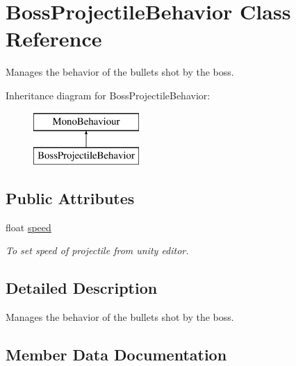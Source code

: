 \hypertarget{class_boss_projectile_behavior}{}\section{Boss\+Projectile\+Behavior Class Reference}
\label{class_boss_projectile_behavior}


Manages the behavior of the bullets shot by the boss.  


Inheritance diagram for Boss\+Projectile\+Behavior\+:\begin{figure}[H]
\begin{center}
\leavevmode
\includegraphics[height=2.000000cm]{class_boss_projectile_behavior}
\end{center}
\end{figure}
\subsection*{Public Attributes}
\begin{DoxyCompactItemize}
\item 
float \mbox{\hyperlink{class_boss_projectile_behavior_a87fd33ddd5893e4b57c9245240855d0e}{speed}}
\begin{DoxyCompactList}\small\item\em To set speed of projectile from unity editor. \end{DoxyCompactList}\end{DoxyCompactItemize}


\subsection{Detailed Description}
Manages the behavior of the bullets shot by the boss. 

\subsection{Member Data Documentation}
\mbox{\label{class_boss_projectile_behavior_a87fd33ddd5893e4b57c9245240855d0e}} 
